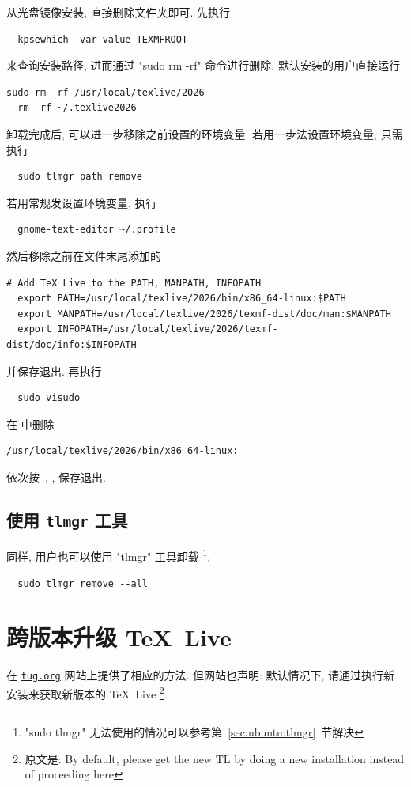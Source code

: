 从光盘镜像安装,
直接删除文件夹即可.
先执行
\begin{lstlisting}
  kpsewhich -var-value TEXMFROOT
\end{lstlisting}
来查询安装路径,
进而通过 "sudo rm -rf" 命令进行删除.
默认安装的用户直接运行
\begin{lstlisting}[deletekeywords = local]
  sudo rm -rf /usr/local/texlive/2026
  rm -rf ~/.texlive2026
\end{lstlisting}

卸载完成后, 可以进一步移除之前设置的环境变量.
若用一步法设置环境变量,
只需执行
\begin{lstlisting}
  sudo tlmgr path remove
\end{lstlisting}
若用常规发设置环境变量,
执行
\begin{lstlisting}
  gnome-text-editor ~/.profile
\end{lstlisting}
然后移除之前在文件末尾添加的
\begin{lstlisting}[deletekeywords = local]
  # Add TeX Live to the PATH, MANPATH, INFOPATH
  export PATH=/usr/local/texlive/2026/bin/x86_64-linux:$PATH
  export MANPATH=/usr/local/texlive/2026/texmf-dist/doc/man:$MANPATH
  export INFOPATH=/usr/local/texlive/2026/texmf-dist/doc/info:$INFOPATH
\end{lstlisting}
并保存退出.
再执行
\begin{lstlisting}
  sudo visudo
\end{lstlisting}
在  中删除
\begin{lstlisting}[deletekeywords = local]
  /usr/local/texlive/2026/bin/x86_64-linux:
\end{lstlisting}
依次按\ , ,  保存退出.

\subsection{使用 \texttt{tlmgr} 工具}

同样,
用户也可以使用 "tlmgr" 工具卸载%
\footnote{"sudo tlmgr" 无法使用的情况可以参考第~\ref{sec:ubuntu:tlmgr}~节解决},
\begin{lstlisting}
  sudo tlmgr remove --all
\end{lstlisting}

\section{跨版本升级 \TeX~Live}\label{sec:ubuntu:version}

在 \href{https://www.tug.org/texlive/upgrade.html}{\texttt{tug.org}}
网站上提供了相应的方法.
但网站也声明:
默认情况下,
请通过执行新安装来获取新版本的 \TeX~Live%
\footnote{原文是: By default,
please get the new TL by doing a new installation instead of proceeding here}.
